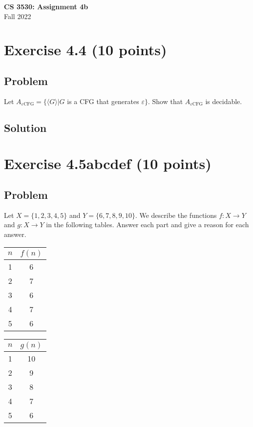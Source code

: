 \documentclass{article}
\begin{document}
\begin{center}
\textbf{\Large CS 3530: Assignment 4b} \\[2mm]
Fall 2022
\end{center}

\raggedright

\section*{Exercise 4.4 (10 points)}

\subsection*{Problem}

Let $A_{\varepsilon\text{CFG}} = \{ \langle G \rangle | G $ is a CFG that generates $ \varepsilon \}$.  Show that $A_{\varepsilon\text{CFG}}$ is decidable.

\subsection*{Solution}



\section*{Exercise 4.5abcdef (10 points)}

\subsection*{Problem}

Let $X = \{ 1,2,3,4,5 \}$ and $Y = \{ 6,7,8,9,10 \}$.  We describe the
functions $f: X \rightarrow Y$ and $g: X \rightarrow Y$ in the following tables.
Answer each part and give a reason for each answer.

\begin{multicols}{2}
  \begin{tabular}{c|c}
    $n$ & $f(n)$ \\
    \hline
    1 & 6 \\
    2 & 7 \\
    3 & 6 \\
    4 & 7 \\
    5 & 6 \\
  \end{tabular}

  \begin{tabular}{c|c}
    $n$ & $g(n)$ \\
    \hline
    1 & 10 \\
    2 & 9 \\
    3 & 8 \\
    4 & 7 \\
    5 & 6 \\
  \end{tabular}
\end{multicols}
\end{document}
